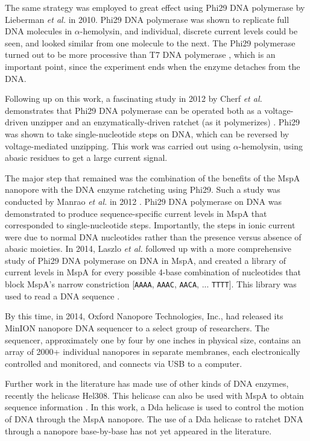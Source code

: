 The same strategy was employed to great effect using Phi29 DNA polymerase by Lieberman \textit{et al.} in 2010.  Phi29 DNA polymerase was shown to replicate full DNA molecules in $\alpha$-hemolysin, and individual, discrete current levels could be seen, and looked similar from one molecule to the next.  The Phi29 polymerase turned out to be more processive than T7 DNA polymerase \citep{Lieberman2010}, which is an important point, since the experiment ends when the enzyme detaches from the DNA.

Following up on this work, a fascinating study in 2012 by Cherf \textit{et al.} demonstrates that Phi29 DNA polymerase can be operated both as a voltage-driven unzipper and an enzymatically-driven ratchet (as it polymerizes) \citep{Cherf2012}.  Phi29 was shown to take single-nucleotide steps on DNA, which can be reversed by voltage-mediated unzipping.  This work was carried out using $\alpha$-hemolysin, using abasic residues to get a large current signal.

The major step that remained was the combination of the benefits of the MspA nanopore with the DNA enzyme ratcheting using Phi29.  Such a study was conducted by Manrao \textit{et al.} in 2012 \citep{Manrao2012}.  Phi29 DNA polymerase on DNA was demonstrated to produce sequence-specific current levels in MspA that corresponded to single-nucleotide steps.  Importantly, the steps in ionic current were due to normal DNA nucleotides rather than the presence versus absence of abasic moieties.  In 2014, Laszlo \textit{et al.} followed up with a more comprehensive study of Phi29 DNA polymerase on DNA in MspA, and created a library of current levels in MspA for every possible 4-base combination of nucleotides that block MspA's narrow constriction [\texttt{AAAA}, \texttt{AAAC}, \texttt{AACA}, ... \texttt{TTTT}].  This library was used to read a DNA sequence \citep{Laszlo2014}.

By this time, in 2014, Oxford Nanopore Technologies, Inc., had released its MinION nanopore DNA sequencer to a select group of researchers.  The sequencer, approximately one by four by one inches in physical size, contains an array of 2000+ individual nanopores in separate membranes, each electronically controlled and monitored, and connects via USB to a computer.

Further work in the literature has made use of other kinds of DNA enzymes, recently the helicase Hel308.  This helicase can also be used with MspA to obtain sequence information \citep{Derrington2015}.  In this work, a Dda helicase is used to control the motion of DNA through the MspA nanopore.  The use of a Dda helicase to ratchet DNA through a nanopore base-by-base has not yet appeared in the literature.

